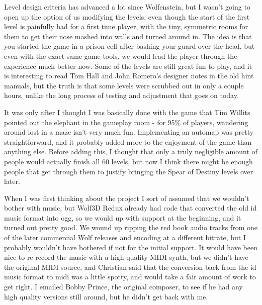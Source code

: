 \documentclass[book.tex]{subfiles}
\begin{document}
Level design criteria has advanced a lot since Wolfenstein, but I wasn't going to open up the option of us modifying the levels, even though the start of the first level is painfully bad for a first time player, with the tiny, symmetric rooms for them to get their nose mashed into walls and turned around in.  The idea is that you started the game in a prison cell after bashing your guard over the head, but even with the exact same game tools, we would lead the player through the experience much better now.  Some of the levels are still great fun to play, and it is interesting to read Tom Hall and John Romero's designer notes in the old hint manuals, but the truth is that some levels were scrubbed out in only a couple hours, unlike the long process of testing and adjustment that goes on today.\\
\par

It was only after I thought I was basically done with the game that Tim Willits pointed out the elephant in the gameplay room - for 95\% of players, wandering around lost in a maze isn't very much fun.
Implementing an automap was pretty straightforward, and it probably added more to the enjoyment of the game than anything else.  Before adding this, I thought that only a truly negligible amount of people would actually finish all 60 levels, but now I think there might be enough people that get through them to justify bringing the Spear of Destiny levels over later.\\
\par

When I was first thinking about the project I sort of assumed that we wouldn't bother with music, but Wolf3D Redux already had code that converted the old id music format into ogg, so we would up with support at the beginning, and it turned out pretty good.  We wound up ripping the red book audio tracks from one of the later commercial Wolf releases and encoding at a different bitrate, but I probably wouldn't have bothered if not for the initial support.  It would have been nice to re-record the music with a high quality MIDI synth, but we didn't have the original MIDI source, and Christian said that the conversion back from the id music format to midi was a little spotty, and would take a fair amount of work to get right.  I emailed Bobby Prince, the original composer, to see if he had any high quality versions still around, but he didn't get back with me.\\
\par
\end{document}
